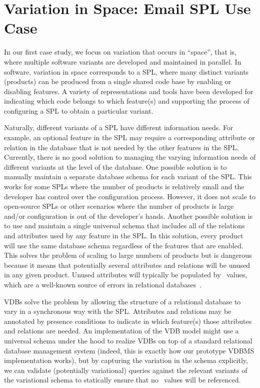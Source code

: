 \section{Variation in Space: Email SPL Use Case}
\label{sec:enron-vdb}


In our first case study, we focus on variation that occurs in ``space'', that
is, where multiple software variants are developed and maintained in parallel.
In software, variation in space corresponds to a SPL, where many distinct
variants (products) can be produced from a single shared code base by enabling
or disabling features. A variety of representations and tools have been
developed for indicating which code belongs to which feature(s) and supporting
the process of configuring a SPL to obtain a particular variant.



Naturally, different variants of a SPL have different information needs. For
example, an optional feature in the SPL may require a corresponding attribute
or relation in the database that is not needed by the other features in the
SPL.
%
Currently, there is no good solution to managing the varying information needs
of different variants at the level of the database.
%
One possible solution is to manually maintain a separate database schema for
each variant of the SPL. This works for some SPLs where the number of products
is relatively small and the developer has control over the configuration
process. However, it does not scale to open-source SPLs or other scenarios
where the number of products is large and/or configuration is out of the
developer's hands.
%
Another possible solution is to use and maintain a single universal schema that
includes all of the relations and attributes used by any feature in the SPL. In
this solution, every product will use the same database schema regardless of
the features that are enabled. This solves the problem of scaling to large
numbers of products but is dangerous because it means that potentially several
attributes and relations will be unused in any given product. Unused attributes
will typically be populated by \nul\ values, which are a well-known source of
errors in relational databases~\cite{AliceBook}.


VDBs solve the problem by allowing the structure of a relational database to
vary in a synchronous way with the SPL. Attributes and relations may be
annotated by presence conditions to indicate in which feature(s) those
attributes and relations are needed.
%
An implementation of the VDB model might use a universal schema under the hood
to realize VDBs on top of a standard relational database management system
(indeed, this is exactly how our prototype VDBMS implementation works), but by
capturing the variation in the schema explicitly, we can validate (potentially
variational) queries against the relevant variants of the variational schema to
statically ensure that no \nul\ values will be referenced.

